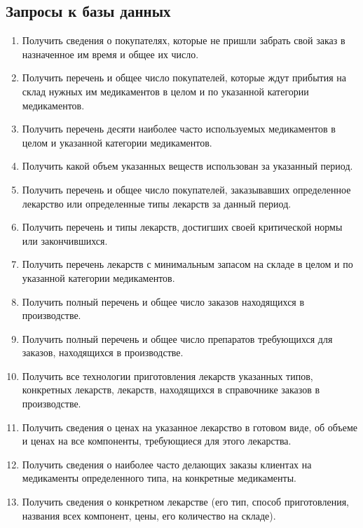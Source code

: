 \documentclass[a4paper]{article}
\begin{document}
		\subsection{Запросы к базы данных}
			\begin{enumerate}			
				\item Получить сведения о покупателях, которые не пришли забрать свой заказ в назначенное им время и общее их число.
				
				\item Получить перечень и общее число покупателей, которые ждут прибытия на склад нужных им медикаментов в целом и по указанной категории медикаментов.
				
				\item Получить перечень десяти наиболее часто используемых медикаментов в целом и указанной категории медикаментов.
				
				\item  Получить какой объем указанных веществ использован за указанный период.
				
				\item Получить перечень и общее число покупателей, заказывавших определенное лекарство или определенные типы лекарств за данный период.
				
				\item Получить перечень и типы лекарств, достигших своей критической нормы или закончившихся.
				
				\item Получить перечень лекарств с минимальным запасом на складе в целом и по указанной категории медикаментов.
				
				\item Получить полный перечень и общее число заказов находящихся в производстве.
				
				\item Получить полный перечень и общее число препаратов требующихся для заказов, находящихся в производстве.
				
				\item Получить все технологии приготовления лекарств указанных типов, конкретных лекарств, лекарств, находящихся в справочнике заказов в производстве.
				
				\item Получить сведения о ценах на указанное лекарство в готовом виде, об объеме и ценах на все компоненты, требующиеся для этого лекарства.
				
				\item Получить сведения о наиболее часто делающих заказы клиентах на медикаменты определенного типа, на конкретные медикаменты.
				
				\item Получить сведения о конкретном лекарстве (его тип, способ приготовления, названия всех компонент, цены, его количество на складе).
			\end{enumerate}
\end{document}
